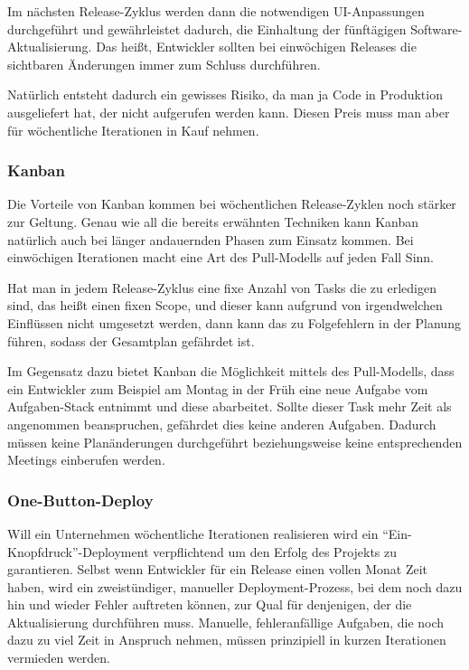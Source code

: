 Im nächsten Release-Zyklus werden dann die notwendigen UI-Anpassungen durchgeführt und gewährleistet dadurch, die Einhaltung der fünftägigen Software-Aktualisierung. Das heißt, Entwickler sollten bei einwöchigen Releases die sichtbaren Änderungen immer zum Schluss durchführen.

Natürlich entsteht dadurch ein gewisses Risiko, da man ja Code in Produktion ausgeliefert hat, der nicht aufgerufen werden kann. Diesen Preis muss man aber für wöchentliche Iterationen in Kauf nehmen.

\subsubsection{Kanban}
Die Vorteile von Kanban kommen bei wöchentlichen Release-Zyklen noch stärker zur Geltung. Genau wie all die bereits erwähnten Techniken kann Kanban natürlich auch bei länger andauernden Phasen zum Einsatz kommen. Bei einwöchigen Iterationen macht eine Art des Pull-Modells auf jeden Fall Sinn. 

Hat man in jedem Release-Zyklus eine fixe Anzahl von Tasks die zu erledigen sind, das heißt einen fixen Scope, und dieser kann aufgrund von irgendwelchen Einflüssen nicht umgesetzt werden, dann kann das zu Folgefehlern in der Planung führen, sodass der Gesamtplan gefährdet ist. 

Im Gegensatz dazu bietet Kanban die Möglichkeit mittels des Pull-Modells, dass ein Entwickler zum Beispiel am Montag in der Früh eine neue Aufgabe vom Aufgaben-Stack entnimmt und diese abarbeitet. Sollte dieser Task mehr Zeit als angenommen beanspruchen, gefährdet dies keine anderen Aufgaben. Dadurch müssen keine Planänderungen durchgeführt beziehungsweise keine entsprechenden Meetings einberufen werden.

\subsubsection{One-Button-Deploy}
Will ein Unternehmen wöchentliche Iterationen realisieren wird ein \enquote{Ein-Knopfdruck}-Deployment verpflichtend um den Erfolg des Projekts zu garantieren. Selbst wenn Entwickler für ein Release einen vollen Monat Zeit haben, wird ein zweistündiger, manueller Deployment-Prozess, bei dem noch dazu hin und wieder Fehler auftreten können, zur Qual für denjenigen, der die Aktualisierung durchführen muss. Manuelle, fehleranfällige Aufgaben, die noch dazu zu viel Zeit in Anspruch nehmen, müssen prinzipiell in kurzen Iterationen vermieden werden.

